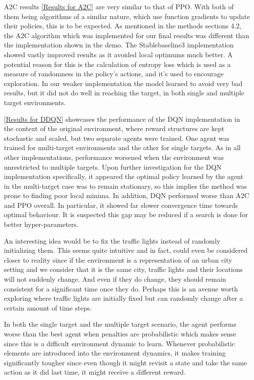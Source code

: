 \documentclass{article}
\begin{document}
	A2C results \ref{Results for A2C} are very similar to that of PPO. With both of them being algorithms of a similar nature, which use function gradients to update their policies, this is to be expected. As mentioned in the methods sections 4.2, the A2C algorithm which was implemented for our final results was different than the implementation shown in the demo. The Stablebaseline3 implementation showed vastly improved results as it avoided local optimums much better. A potential reason for this is the calculation of entropy loss which is used as a measure of randomness in the policy's actions, and it's used to encourage exploration. In our weaker implementation the model learned to avoid very bad results, but it did not do well in reaching the target, in both single and multiple target environments.    
		
	\ref{Results for DDQN} showcases the performance of the DQN implementation in the context of the original environment, where reward structures are kept stochastic and scaled, but two separate agents were trained. One agent was trained for multi-target environments and the other for single targets. As in all other implementations, performance worsened when the environment was unrestricted to multiple targets. Upon further investigation for the DQN implementation specifically, it appeared the optimal policy learned by the agent in the multi-target case was to remain stationary, so this implies the method was prone to finding poor local minima. In addition, DQN performed worse than A2C and PPO overall. In particular, it showed far slower convergence time towards optimal behaviour. It is suspected this gap may be reduced if a search is done for better hyper-parameters.
	
	An interesting idea would be to fix the traffic lights instead of randomly initializing them. This seems quite intuitive and in fact, could even be considered closer to reality since if the environment is a representation of an urban city setting and we consider that it is the same city, traffic lights and their locations will not suddenly change. And even if they do change, they should remain consistent for a significant time once they do. Perhaps this is an avenue worth exploring where traffic lights are initially fixed but can randomly change after a certain amount of time steps. 
	
	In both the single target and the multiple target scenario, the agent performs worse than the best agent when penalties are probabilistic which makes sense since this is a difficult environment dynamic to learn. Whenever probabilistic elements are introduced into the environment dynamics, it makes training significantly tougher since even though it might revisit a state and take the same action as it did last time, it might receive a different reward.
	
\end{document}
